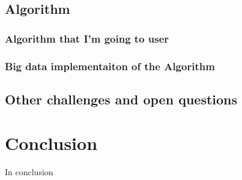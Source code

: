 \documentclass[english]{tktltiki}
\begin{document}
\subsection{Algorithm}
\subsubsection{Algorithm that I'm going to user}
\subsubsection{Big data implementaiton of the Algorithm}



\subsection{Other challenges and open questions}



\section{Conclusion}
In conclusion
\pagebreak







\lastpage

\appendices

\pagestyle{empty}
\end{document}
